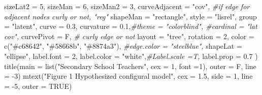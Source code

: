 \documentclass[
]{article}
\newenvironment{Shaded}{\begin{snugshade}}{\end{snugshade}}
\newcommand{\AttributeTok}[1]{\textcolor[rgb]{0.77,0.63,0.00}{#1}}
\newcommand{\CommentTok}[1]{\textcolor[rgb]{0.56,0.35,0.01}{\textit{#1}}}
\newcommand{\ConstantTok}[1]{\textcolor[rgb]{0.00,0.00,0.00}{#1}}
\newcommand{\DecValTok}[1]{\textcolor[rgb]{0.00,0.00,0.81}{#1}}
\newcommand{\FloatTok}[1]{\textcolor[rgb]{0.00,0.00,0.81}{#1}}
\newcommand{\FunctionTok}[1]{\textcolor[rgb]{0.00,0.00,0.00}{#1}}
\newcommand{\NormalTok}[1]{#1}
\newcommand{\SpecialCharTok}[1]{\textcolor[rgb]{0.00,0.00,0.00}{#1}}
\newcommand{\StringTok}[1]{\textcolor[rgb]{0.31,0.60,0.02}{#1}}
\begin{document}
\begin{Shaded}
\begin{Highlighting}[]
         \AttributeTok{sizeLat2 =} \DecValTok{5}\NormalTok{,}
         \AttributeTok{sizeMan =} \DecValTok{6}\NormalTok{,}
         \AttributeTok{sizeMan2 =} \DecValTok{3}\NormalTok{,}
         \AttributeTok{curveAdjacent =} \StringTok{"cov"}\NormalTok{, }\CommentTok{\#if edge for adjacent nodes curly or not, "reg"}
         \AttributeTok{shapeMan =} \StringTok{"rectangle"}\NormalTok{,}
         \AttributeTok{style =} \StringTok{"lisrel"}\NormalTok{,}
         \AttributeTok{group =} \StringTok{"latent"}\NormalTok{,}
         \AttributeTok{curve =} \FloatTok{0.3}\NormalTok{,}
         \AttributeTok{curvature =} \FloatTok{0.1}\NormalTok{,}\CommentTok{\#theme = "colorblind", \#cardinal = "lat cov",}
         \AttributeTok{curvePivot =}\NormalTok{ F, }\CommentTok{\# curly edge or not}
         \AttributeTok{layout =} \StringTok{"tree"}\NormalTok{,}
         \AttributeTok{rotation =} \DecValTok{2}\NormalTok{,}
         \AttributeTok{color =} \FunctionTok{c}\NormalTok{(}\StringTok{"\#c68642"}\NormalTok{, }\StringTok{"\#58668b"}\NormalTok{, }\StringTok{"\#8874a3"}\NormalTok{), }\CommentTok{\#edge.color = "steelblue",}
         \AttributeTok{shapeLat =} \StringTok{"ellipse"}\NormalTok{,}
         \AttributeTok{label.font =} \DecValTok{2}\NormalTok{,}
         \AttributeTok{label.color =} \StringTok{"white"}\NormalTok{,}\CommentTok{\#Label.scale =T,}
         \AttributeTok{label.prop =} \FloatTok{0.7}
\NormalTok{         )}
\FunctionTok{title}\NormalTok{(}\AttributeTok{main =} \FunctionTok{list}\NormalTok{(}\StringTok{"Secondary School Teachers"}\NormalTok{,}
                  \AttributeTok{cex =} \DecValTok{1}\NormalTok{, }\AttributeTok{font =}\DecValTok{1}\NormalTok{), }\AttributeTok{outer =}\NormalTok{ F, }\AttributeTok{line =} \SpecialCharTok{{-}}\DecValTok{3}\NormalTok{)}
\FunctionTok{mtext}\NormalTok{(}\StringTok{"Figure 1 Hypothesized configural model"}\NormalTok{, }\AttributeTok{cex =} \FloatTok{1.5}\NormalTok{, }\AttributeTok{side =} \DecValTok{1}\NormalTok{, }\AttributeTok{line =} \SpecialCharTok{{-}}\DecValTok{5}\NormalTok{, }\AttributeTok{outer =} \ConstantTok{TRUE}\NormalTok{)}
\end{Highlighting}
\end{Shaded}
\end{document}

